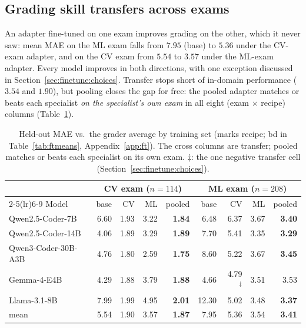 \subsection{Grading skill transfers across exams}
\label{sec:finetune:transfer}

An adapter fine-tuned on one exam improves grading on the other, which it never saw: mean MAE on the ML exam falls from $7.95$ (base) to $5.36$ under the CV-exam adapter, and on the CV exam from $5.54$ to $3.57$ under the ML-exam adapter. Every model improves in both directions, with one exception discussed in Section~\ref{sec:finetune:choices}. Transfer stops short of in-domain performance ($3.54$ and $1.90$), but pooling closes the gap for free: the pooled adapter matches or beats each specialist \emph{on the specialist's own exam} in all eight (exam $\times$ recipe) columns (Table~\ref{tab:ftmain}).

\begin{table}[t]
\centering
\caption{Held-out MAE vs.\ the grader average by training set (marks recipe; bd in Table~\ref{tab:ftmeans}, Appendix~\ref{app:ft}). The cross columns are transfer; pooled matches or beats each specialist on its own exam. $\ddagger$: the one negative transfer cell (Section~\ref{sec:finetune:choices}).}
\label{tab:ftmain}
\small
\setlength{\tabcolsep}{4.5pt}
\begin{tabular}{lrrrrrrrr}
\toprule
& \multicolumn{4}{c}{CV exam ($n{=}114$)} & \multicolumn{4}{c}{ML exam ($n{=}208$)} \\
\cmidrule(lr){2-5}\cmidrule(lr){6-9}
Model & base & CV & ML & pooled & base & CV & ML & pooled \\
\midrule
Qwen2.5-Coder-7B    & 6.60 & 1.93 & 3.22 & \textbf{1.84} & 6.48 & 6.37 & 3.67 & \textbf{3.40} \\
Qwen2.5-Coder-14B   & 4.06 & 1.89 & 3.29 & \textbf{1.89} & 7.70 & 5.41 & 3.35 & \textbf{3.29} \\
Qwen3-Coder-30B-A3B & 4.76 & 1.80 & 2.59 & \textbf{1.75} & 8.60 & 5.22 & 3.67 & \textbf{3.45} \\
Gemma-4-E4B         & 4.29 & 1.88 & 3.79 & \textbf{1.88} & 4.66 & 4.79$^\ddagger$ & 3.51 & 3.53 \\
Llama-3.1-8B        & 7.99 & 1.99 & 4.95 & \textbf{2.01} & 12.30 & 5.02 & 3.48 & \textbf{3.37} \\
\midrule
mean                & 5.54 & 1.90 & 3.57 & \textbf{1.87} & 7.95 & 5.36 & 3.54 & \textbf{3.41} \\
\bottomrule
\end{tabular}
\end{table}

